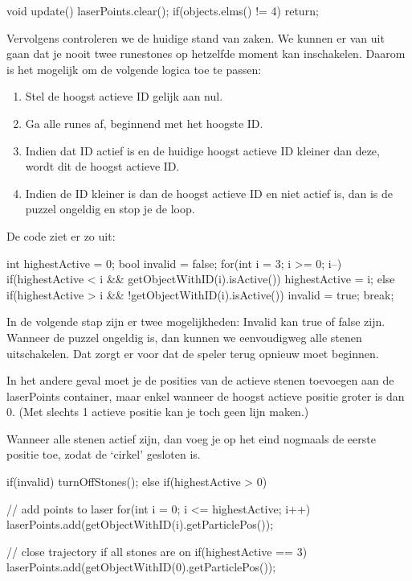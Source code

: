 \begin{code} 
void update() {
  laserPoints.clear();
  if(objects.elms() != 4) return;
}
\end{code}

Vervolgens controleren we de huidige stand van zaken. We kunnen er van uit gaan dat je nooit twee runestones op hetzelfde moment kan inschakelen. Daarom is het mogelijk om de volgende logica toe te passen:
\begin{enumerate}
	\item Stel de hoogst actieve ID gelijk aan nul.
	\item Ga alle runes af, beginnend met het hoogste ID.
	\item Indien dat ID actief is en de huidige hoogst actieve ID kleiner dan deze, wordt dit de hoogst actieve ID.
	\item Indien de ID kleiner is dan de hoogst actieve ID en niet actief is, dan is de puzzel ongeldig en stop je de loop.
\end{enumerate}

De code ziet er zo uit:
\begin{code}
int highestActive = 0;
bool invalid = false;
for(int i = 3; i >= 0;  i--)
{
  if(highestActive < i && getObjectWithID(i).isActive())
  {
     highestActive = i;
  } else if(highestActive > i && !getObjectWithID(i).isActive())
  {
     invalid = true;
     break;
  }
}
\end{code}

In de volgende stap zijn er twee mogelijkheden: Invalid kan true of false zijn. Wanneer de puzzel ongeldig is, dan kunnen we eenvoudigweg alle stenen uitschakelen. Dat zorgt er voor dat de speler terug opnieuw moet beginnen.

In het andere geval moet je de posities van de actieve stenen toevoegen aan de laserPoints container, maar enkel wanneer de hoogst actieve positie groter is dan 0. (Met slechts 1 actieve positie kan je toch geen lijn maken.)

Wanneer alle stenen actief zijn, dan voeg je op het eind nogmaals de eerste positie toe, zodat de `cirkel' gesloten is.

\begin{code}
if(invalid)
{
  turnOffStones();
} else if(highestActive > 0)
{
  // add points to laser
  for(int i = 0; i <= highestActive; i++)
  {
    laserPoints.add(getObjectWithID(i).getParticlePos());
  }
 
  // close trajectory if all stones are on
  if(highestActive == 3)
  {
    laserPoints.add(getObjectWithID(0).getParticlePos());
  }
}
\end{code}


